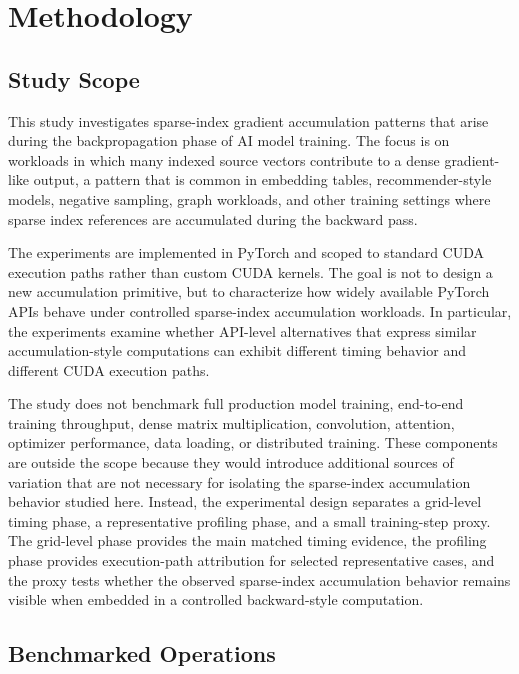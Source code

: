 \section{Methodology}
\label{sec:methodology}

\subsection{Study Scope}

This study investigates sparse-index gradient accumulation patterns that arise during the backpropagation phase of AI model training. The focus is on workloads in which many indexed source vectors contribute to a dense gradient-like output, a pattern that is common in embedding tables, recommender-style models, negative sampling, graph workloads, and other training settings where sparse index references are accumulated during the backward pass.

The experiments are implemented in PyTorch \citep{paszke2019pytorch} and scoped to standard CUDA execution paths rather than custom CUDA kernels. The goal is not to design a new accumulation primitive, but to characterize how widely available PyTorch APIs behave under controlled sparse-index accumulation workloads. In particular, the experiments examine whether API-level alternatives that express similar accumulation-style computations can exhibit different timing behavior and different CUDA execution paths.

The study does not benchmark full production model training, end-to-end training throughput, dense matrix multiplication, convolution, attention, optimizer performance, data loading, or distributed training. These components are outside the scope because they would introduce additional sources of variation that are not necessary for isolating the sparse-index accumulation behavior studied here. Instead, the experimental design separates a grid-level timing phase, a representative profiling phase, and a small training-step proxy. The grid-level phase provides the main matched timing evidence, the profiling phase provides execution-path attribution for selected representative cases, and the proxy tests whether the observed sparse-index accumulation behavior remains visible when embedded in a controlled backward-style computation.

\subsection{Benchmarked Operations}

